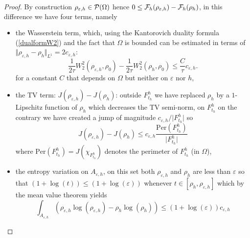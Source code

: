 \documentclass[12pt, a4paper]{article}
\numberwithin{equation}{section}
\theoremstyle{plain}
\theoremstyle{definition}
\theoremstyle{remark}
\newcommand\eps{\varepsilon}
\newcommand\F{{\cal F}}
\newcommand\PP{{\cal P}}
\newcommand{\Per}{\mathrm{Per}}
\newcommand\pref[1]{(\ref{#1})}
\begin{document}
\begin{proof}
By construction $\rho_{\eps,h} \in \PP(\Omega)$ hence $0\le \F_h(\rho_{\eps,h})-\F_h(\rho_h)$, in this difference we have four terms, namely 
\begin{itemize}

\item the Wasserstein term, which, using the Kantorovich duality formula \pref{dualformW2} and the fact that $\Omega$ is bounded can be estimated in terms of $\Vert \rho_{\eps,h}-\rho_h\Vert_{L^1} =2 c_{\eps,h}$:
\begin{equation}\label{estim1}
\frac{1}{2\tau} W_2^2(\rho_{\eps,h}, \rho_0)-\frac{1}{2\tau} W_2^2(\rho_h, \rho_0) \le \frac{C}{\tau}   c_{\eps,h}.
\end{equation}
for a constant $C$ that depends on $\Omega$ but neither on $\eps$ nor $h$,

\item the TV term: $J(\rho_{\eps,h})-J(\rho_h)$: outside $F_{t_h}^h$ we have replaced $\rho_h$ by a $1$-Lipschitz function of $\rho_h$ which decreases the TV semi-norm, on $F_{t_h}^h$ on the contrary we have created a jump of magnitude $c_{\eps, h} /\vert F_{t_h}^h\vert$ so
 \begin{equation}\label{estim2}
J(\rho_{\eps,h})-J(\rho_h) \le c_{\eps,h} \frac{\Per(F_{t_h}^h)}{\vert F_{t_h}^h\vert} 
\end{equation}
where $\Per(F_{t_h}^h)=J(\chi_{F_{t_h}^h})$ denotes the perimeter of $F_{t_h}^h$ (in $\Omega$),

\item the entropy variation on $A_{\eps,h}$, on this set both $\rho_{\eps,h}$ and $\rho_h$ are less than $\eps$ so that $(1+\log(t)) \le (1+\log(\eps))$ whenever $t\in [\rho_h, \rho_{\eps,h}]$ which by the mean value theorem
 yields 
 \begin{equation}\label{estim3}
\int_{A_{\eps,h}} (\rho_{\eps, h} \log(\rho_{\eps, h})     -\rho_h \log (\rho_h)) \le (1+\log(\eps)) c_{\eps,h}
\end{equation}



\end{itemize}
\end{proof}
\end{document}
